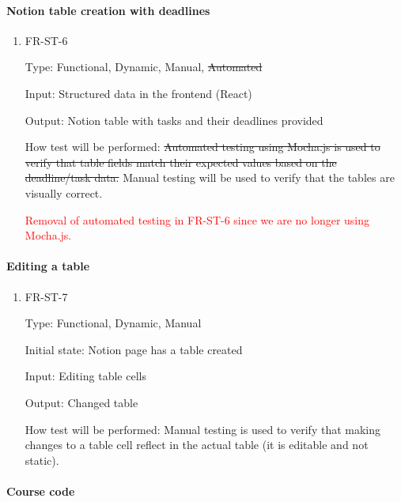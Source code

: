 \documentclass[12pt, titlepage]{article}
\begin{document}
\paragraph{Notion table creation with deadlines}

\begin{enumerate}

\item{FR-ST-6\\}

Type: Functional, Dynamic, Manual, \sout{Automated} 

Input: Structured data in the frontend (React) 

Output: Notion table with tasks and their deadlines provided 

How test will be performed: \sout{Automated testing using Mocha.js is used to verify that table fields match their expected values based on the deadline/task data.} Manual testing will be used to verify that the tables are visually correct. 

\textcolor{red}{Removal of automated testing in FR-ST-6 since we are no longer using Mocha.js.}

\end{enumerate}

\paragraph{Editing a table}

\begin{enumerate}

\item{FR-ST-7\\}

Type: Functional, Dynamic, Manual 

Initial state: Notion page has a table created 

Input: Editing table cells 

Output: Changed table 

How test will be performed: Manual testing is used to verify that making changes to a table cell reflect in the actual table (it is editable and not static).

\end{enumerate}

\paragraph{Course code}
\end{document}
